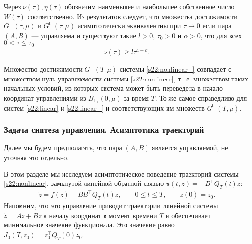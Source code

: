 \documentclass[../main.tex]{subfiles}
\begin{document}
Через $\nu(\tau), \eta(\tau)$ обозначим наименьшее и наибольшее собственное число $W(\tau)$ соответственно. 
Из результатов \cite{Polyak2001,GusevOsipovTrudy,Osipov,GusevMotor} следует, что множества достижимости 
$G_{-}(\tau,\mu)$ и $G_{-}^0(\tau,\mu)$ асимптотически эквивалентны при $\tau \to 0$ если пара $(A,B)$ --- управляема 
и существуют такие $ l > 0$, $\tau_0 > 0$ и $\alpha > 0$, что для всех $0 < \tau \leqslant \tau_0 $
 \begin{gather}\label{s22:gramas}
 \nu(\tau)\geqslant l\tau^{4-\alpha}.
 \end{gather}

\begin{zam}
 Множество достижимости $G_{-}(T,\mu)$ системы \eqref{s22:nonlinear_} совпадает с множеством нуль-управляемости системы \eqref{s22:nonlinear}, т.~е. множеством таких начальных условий, из которых система может быть переведена в начало координат управлениями из $B_{\mathbb{L}_2}(0,\mu) $ за время $T$. 
 То же самое справедливо для систем \eqref{s22:linear} и \eqref{s22:linear_} и соответствующих им множеств $G_{-}^0(T,\mu)$.
\end{zam}

\subsubsection{Задача синтеза управления. Асимптотика траекторий}

Далее мы будем предполагать, что пара $(A,B)$ является управляемой, не уточняя это отдельно.

В этом разделе мы исследуем асимптотическое поведение траекторий системы \eqref{s22:nonlinear}, замкнутой линейной обратной связью $ u(t,z) = -B^{\top} Q_T(t) z$:
\begin{gather}\label{s22:nonlinear_closed}
 \dot{z} = f(z) - B B^{\top} Q_T(t) z, \qquad 0 \leqslant t \leqslant T, \qquad z(0) = z_0.
\end{gather}
Напомним, что это управление приводит траектории линейной системы $\dot{z} = A z + B z$ к началу координат в момент времени $T$ и обеспечивает минимальное значение функционала. 
Это значение равно $J_0(T,z_0) =z_0^{\top}Q_T(0)z_0$.
\end{document}
